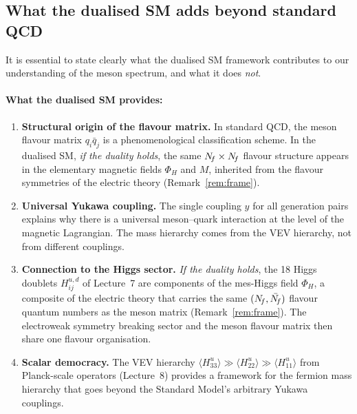 \documentclass[11pt,a4paper]{article}
\begin{document}
\subsection{What the dualised SM adds beyond standard QCD}
\label{sec:dsm-adds}

It is essential to state clearly what the dualised SM framework
contributes to our understanding of the meson spectrum, and what it
does \emph{not}.

\paragraph{What the dualised SM provides:}
\begin{enumerate}[label=(\alph*)]
  \item \textbf{Structural origin of the flavour matrix.}
    In standard QCD, the meson flavour matrix $q_i\bar{q}_j$ is a
    phenomenological classification scheme.  In the dualised SM,
    \emph{if the duality holds}, the same $N_{\!f} \times N_{\!f}$ flavour
    structure appears in the elementary magnetic fields $\Phi_H$ and
    $M$, inherited from the flavour symmetries of the electric theory
    (Remark~\ref{rem:frame}).
  \item \textbf{Universal Yukawa coupling.}
    The single coupling $y$ for all generation pairs explains why there
    is a universal meson--quark interaction at the level of the magnetic
    Lagrangian.  The mass hierarchy comes from the VEV hierarchy, not
    from different couplings.
  \item \textbf{Connection to the Higgs sector.}
    \emph{If the duality holds}, the 18 Higgs doublets
    $H_{ij}^{u,d}$ of Lecture~7 are components of the mes-Higgs field
    $\Phi_H$, a composite of the electric theory that carries the same
    $(N_{\!f}, \bar{N_{\!f}})$ flavour quantum numbers as the meson matrix
    (Remark~\ref{rem:frame}).  The electroweak symmetry breaking sector
    and the meson flavour matrix then share one flavour organisation.
  \item \textbf{Scalar democracy.}
    The VEV hierarchy $\langle H_{33}^u \rangle \gg \langle H_{22}^u
    \rangle \gg \langle H_{11}^u \rangle$ from Planck-scale operators
    (Lecture~8) provides a framework for the fermion mass hierarchy
    that goes beyond the Standard Model's arbitrary Yukawa couplings.
\end{enumerate}
\end{document}
